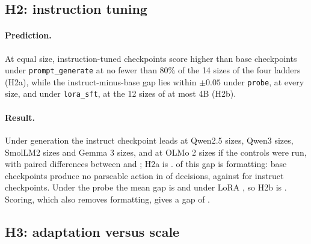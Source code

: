 \subsection{H2: instruction tuning}
\label{sec:res:h2}

\paragraph{Prediction.} At equal size, instruction-tuned checkpoints score higher than base checkpoints under \texttt{prompt\_generate} at no fewer than 80\% of the 14 sizes of the four ladders (H2a), while the instruct-minus-base gap lies within $\pm0.05$ under \texttt{probe}, at every size, and under \texttt{lora\_sft}, at the 12 sizes of at most 4B (H2b).

\paragraph{Result.} Under generation the instruct checkpoint leads at \result{[$k$ of 4]} Qwen2.5 sizes, \result{[$k$ of 4]} Qwen3 sizes, \result{[$k$ of 3]} SmolLM2 sizes and \result{[$k$ of 3]} Gemma 3 sizes, and at \result{[$k$ of 2]} OLMo 2 sizes if the controls were run, with paired differences between \result{[smallest]} and ; H2a is .  of this gap is formatting: base checkpoints produce no parseable action in  of decisions, against  for instruct checkpoints. Under the probe the mean gap is  and under LoRA , so H2b is . Scoring, which also removes formatting, gives a gap of . 

\subsection{H3: adaptation versus scale}
\label{sec:res:h3}

